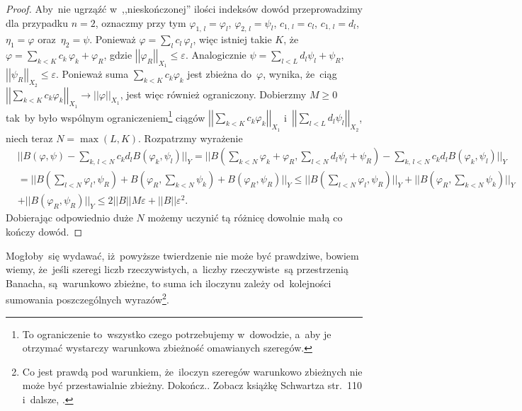 \documentclass[a4paper,11pt]{article}
\newcommand{\ra}{\rightarrow}
\newcommand{\veps}{\varepsilon}
\newcommand{\vp}{\varphi}
\newcommand{\Sum}{\sum\limits}
\newcommand{\norm}[1]{\left|\left| #1 \right|\right|}
\newcommand{\Dok}{{\color{red} Dokończ.}}
\begin{document}
\begin{proof}
  Aby~nie ugrząźć w~,,nieskończonej'' ilości indeksów dowód
  przeprowadzimy dla przypadku $n = 2$, oznaczmy przy tym
  $\vp_{ 1,\, l } = \vp_{ l }$, $\vp_{ 2, \, l } = \psi_{ l }$,
  $c_{ 1, \, l } = c_{ l }$, $c_{ 1, \, l } = d_{ l }$,
  $\eta_{ 1 } = \vp$ oraz~$\eta_{ 2 } = \psi$. Ponieważ
  $\vp = \sum_{ l } c_{ l } \, \vp_{ l }$, więc istniej takie $K$,
  że~$\vp = \sum_{ k < K } c_{ k } \, \vp_{ k } + \vp_{ R }$, gdzie
  $\norm{ \vp_{ R } }_{ X_{ 1 } } \leq \veps$. Analogicznie
  $\psi = \sum_{ l < L } d_{ l } \psi_{ l } + \psi_{ R }$,
  $\norm{ \psi_{ R } }_{ X_{ 2 } } \leq \veps$. Ponieważ suma
  $\sum_{ k < K } c_{ k } \vp_{ k }$ jest zbieżna do~$\vp$, wynika,
  że~ciąg
  $\norm{ \sum_{ k < K } c_{ k } \vp_{ k } }_{ X_{ 1 } } \ra \norm{
    \vp }_{ X_{ 1 } }$, jest więc również ograniczony. Dobierzmy
  $M \geq 0$ tak~by było wspólnym ograniczeniem\footnote{To
    ograniczenie to~wszystko czego potrzebujemy w~dowodzie, a~aby je
    otrzymać wystarczy warunkowa zbieżność omawianych szeregów.}
  ciągów $\norm{ \sum_{ k < K } c_{ k } \vp_{ k } }_{ X_{ 1 } }$
  i~$\norm{ \sum_{ l < L } d_{ l } \psi_{ l } }_{ X_{ 2 } }$, niech
  teraz $N = \max( L, K )$. Rozpatrzmy wyrażenie
  \begin{equation*}
    \begin{split}
      & || B( \vp, \psi ) - \Sum_{ k, \, l < N } c_{ k } d_{ l } B(
      \vp_{ k }, \psi_{ l } ) ||_{ Y } = || B( \Sum_{ k < N } \vp_{ k
      } + \vp_{ R }, \Sum_{ l < N } d_{ l } \psi_{ l } + \psi_{ R }) -
      \Sum_{ k,\, l < N } c_{ k } d_{ l }
      B( \vp_{ k }, \psi_{ l } ) ||_{ Y } \\
      &= || B( \Sum_{ l < N } \vp_{ l }, \psi_{ R } ) + B( \vp_{ R },
      \Sum_{ k < N } \psi_{ k } ) + B( \vp_{ R }, \psi_{ R } ) ||_{ Y
      } \leq || B( \Sum_{ l < N } \vp_{ l }, \psi_{ R } ) ||_{ Y }
      + || B( \vp_{ R }, \Sum_{ k < N } \psi_{ k } ) ||_{ Y } \\
      &+ || B( \vp_{ R }, \psi_{ R } ) ||_{ Y } \leq 2 \norm{ B } M
      \veps + \norm{ B } \veps^{ 2 }.
    \end{split}
  \end{equation*}
  Dobierając odpowiednio duże $N$ możemy uczynić tą różnicę dowolnie
  małą co kończy dowód.
\end{proof}

Mogłoby~się wydawać, iż~powyższe twierdzenie nie może być prawdziwe,
bowiem wiemy, że~jeśli szeregi liczb rzeczywistych, a~liczby
rzeczywiste~są przestrzenią Banacha, są~warunkowo zbieżne, to suma ich
iloczynu zależy od~kolejności sumowania poszczególnych
wyrazów\footnote{Co jest prawdą pod warunkiem, że~iloczyn szeregów
  warunkowo zbieżnych nie może być przestawialnie zbieżny. \Dok.
  Zobacz książkę Schwartza str.~110 i~dalsze,
  \cite{SchwartzKursAnalizyMatematycznej79}.}.
\end{document}
